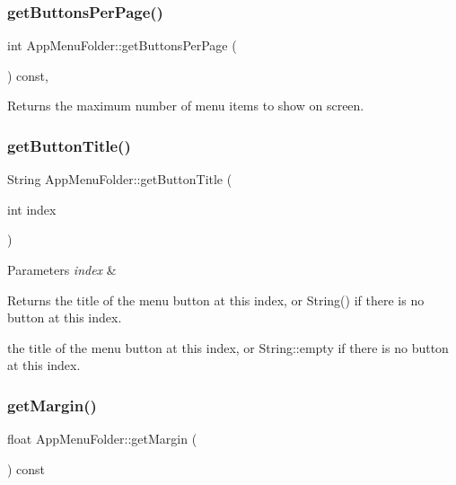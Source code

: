 \subsubsection{\texorpdfstring{get\+Buttons\+Per\+Page()}{getButtonsPerPage()}}
{\footnotesize\ttfamily int App\+Menu\+Folder\+::get\+Buttons\+Per\+Page (\begin{DoxyParamCaption}{ }\end{DoxyParamCaption}) const\hspace{0.3cm}{\ttfamily [inline]}, {\ttfamily [protected]}}

\begin{DoxyReturn}{Returns}
the maximum number of menu items to show on screen. 
\end{DoxyReturn}
\mbox{\label{classAppMenuFolder_a7a3877a0355eabfb63d90a9c4bab1cc0}} 
\subsubsection{\texorpdfstring{get\+Button\+Title()}{getButtonTitle()}}
{\footnotesize\ttfamily String App\+Menu\+Folder\+::get\+Button\+Title (\begin{DoxyParamCaption}\item[{int}]{index }\end{DoxyParamCaption})\hspace{0.3cm}{\ttfamily [protected]}}


\begin{DoxyParams}{Parameters}
{\em index} & \\
\hline
\end{DoxyParams}
\begin{DoxyReturn}{Returns}
the title of the menu button at this index, or String() if there is no button at this index.

the title of the menu button at this index, or String\+::empty if there is no button at this index. 
\end{DoxyReturn}
\mbox{\label{classAppMenuFolder_a3b57b4273a72020916825601ab453cf7}} 
\subsubsection{\texorpdfstring{get\+Margin()}{getMargin()}}
{\footnotesize\ttfamily float App\+Menu\+Folder\+::get\+Margin (\begin{DoxyParamCaption}{ }\end{DoxyParamCaption}) const}

